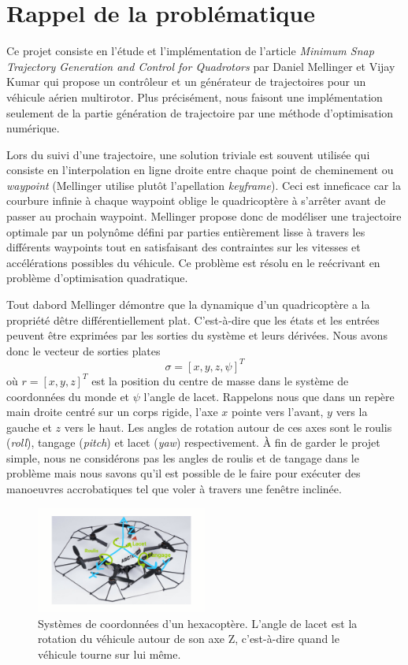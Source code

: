 \section{Rappel de la problématique}

Ce projet consiste en l'étude et l'implémentation de l'article \textit{Minimum Snap Trajectory Generation and Control for Quadrotors} par Daniel Mellinger et Vijay Kumar \cite{Mellinger2011} qui propose un contrôleur et un générateur de trajectoires pour un véhicule aérien multirotor. Plus précisément, nous faisont une implémentation seulement de la partie génération de trajectoire par une méthode d'optimisation numérique.

Lors du suivi d'une trajectoire, une solution triviale est souvent utilisée qui consiste en l'interpolation en ligne droite entre chaque point de cheminement ou \textit{waypoint} (Mellinger utilise plutôt l'apellation \textit{keyframe}). Ceci est inneficace car la courbure infinie à chaque waypoint oblige le quadricoptère à s'arrêter avant de passer au prochain waypoint. Mellinger propose donc de modéliser une trajectoire optimale par un polynôme défini par parties entièrement lisse à travers les différents waypoints tout en satisfaisant des contraintes sur les vitesses et accélérations possibles du véhicule. Ce problème est résolu en le reécrivant en problème d'optimisation quadratique.

Tout dabord Mellinger démontre que la dynamique d'un quadricoptère a la propriété dêtre différentiellement plat. C'est-à-dire que les états et les entrées peuvent être exprimées par les sorties du système et leurs dérivées. Nous avons donc le vecteur de sorties plates
$$\sigma = [x, y, z, \psi]^T$$
où $r = [x, y, z]^T$ est la position du centre de masse dans le système de coordonnées du monde et $\psi$ l'angle de lacet. Rappelons nous que dans un repère main droite centré sur un corps rigide, l'axe $x$ pointe vers l'avant, $y$ vers la gauche et $z$ vers le haut. Les angles de rotation autour de ces axes sont le roulis (\textit{roll}), tangage (\textit{pitch}) et lacet (\textit{yaw}) respectivement. À fin de garder le projet simple, nous ne considérons pas les angles de roulis et de tangage dans le problème mais nous savons qu'il est possible de le faire pour exécuter des manoeuvres accrobatiques tel que voler à travers une fenêtre inclinée.

\begin{figure}[h]
	\centering
	\includegraphics[width=0.5\textwidth]{fig/firefly.png}
	\caption{Systèmes de coordonnées d'un hexacoptère. L'angle de lacet est la rotation du véhicule autour de son axe Z, c'est-à-dire quand le véhicule tourne sur lui même.}
\end{figure}

